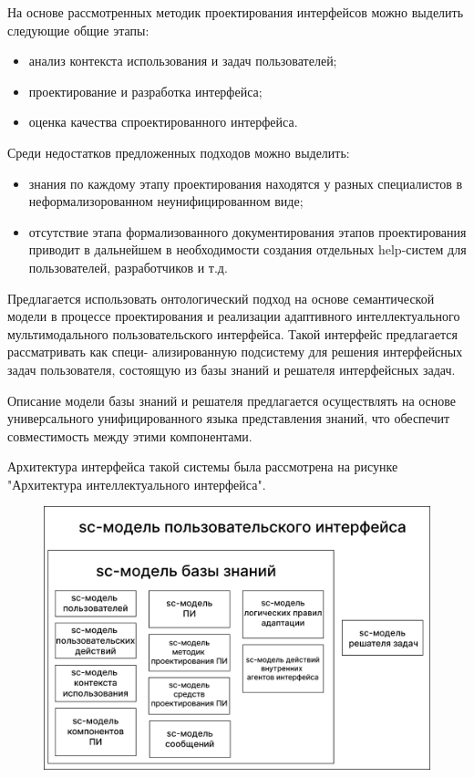 На основе рассмотренных методик проектирования интерфейсов можно выделить следующие общие этапы:
\begin{itemize}
\item анализ контекста использования и задач пользователей;
\item проектирование и разработка интерфейса;
\item оценка качества спроектированного интерфейса.
\end{itemize}

Среди недостатков предложенных подходов можно выделить:
\begin{itemize}
	\item знания по каждому этапу проектирования находятся у разных специалистов в неформализорованном неунифицированном виде;
	\item отсутствие этапа формализованного документирования этапов проектирования приводит в дальнейшем в необходимости создания отдельных help-систем для пользователей, разработчиков и т.д.
\end{itemize}

Предлагается использовать онтологический подход на основе семантической модели в процессе проектирования и реализации адаптивного интеллектуального мультимодального пользовательского интерфейса. Такой интерфейс предлагается рассматривать как специ-
ализированную подсистему для решения интерфейсных задач пользователя, состоящую из базы знаний и решателя интерфейсных задач. 

Описание модели базы знаний и решателя предлагается осуществлять на основе универсального унифицированного языка представления знаний, что обеспечит совместимость между этими компонентами.

Архитектура интерфейса такой системы была рассмотрена на рисунке "Архитектура интеллектуального интерфейса"{}.

\begin{figure}[h]
	\centering
	\includegraphics[scale=0.15]{images/part5/sc-model-ui.png}
\end{figure}

